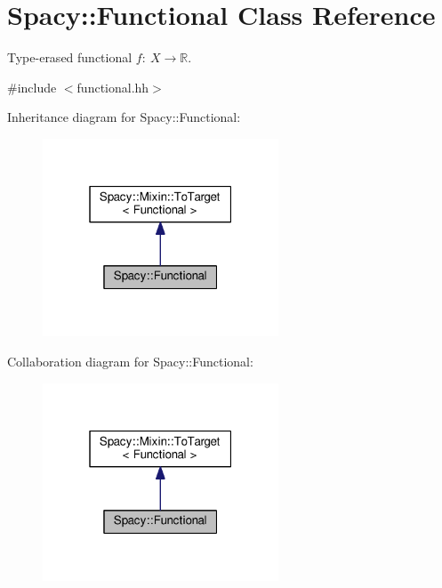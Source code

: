 \hypertarget{classSpacy_1_1Functional}{}\section{Spacy\+:\+:Functional Class Reference}
\label{classSpacy_1_1Functional}


Type-\/erased functional $f:\ X \to \mathbb{R} $.  




{\ttfamily \#include $<$functional.\+hh$>$}



Inheritance diagram for Spacy\+:\+:Functional\+:\nopagebreak
\begin{figure}[H]
\begin{center}
\leavevmode
\includegraphics[width=199pt]{classSpacy_1_1Functional__inherit__graph}
\end{center}
\end{figure}


Collaboration diagram for Spacy\+:\+:Functional\+:\nopagebreak
\begin{figure}[H]
\begin{center}
\leavevmode
\includegraphics[width=199pt]{classSpacy_1_1Functional__coll__graph}
\end{center}
\end{figure}

